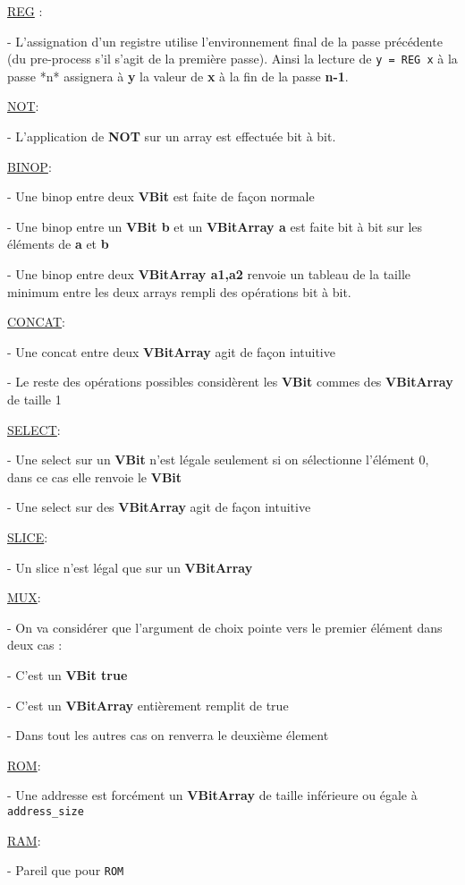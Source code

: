 \documentclass{article}
\begin{document}
\underline{REG} :

- L'assignation d'un registre utilise l'environnement final de la passe précédente (du pre-process s'il s'agit de la première passe). Ainsi la lecture de \verb|y = REG x| à la passe *n* assignera à \textbf{y} la valeur de \textbf{x} à la fin de la passe \textbf{n-1}. 

\underline{NOT}:

- L'application de \textbf{NOT} sur un array est effectuée bit à bit.

\underline{BINOP}:

- Une binop entre deux \textbf{VBit} est faite de façon normale

- Une binop entre un \textbf{VBit b} et un \textbf{VBitArray a}  est faite bit à bit sur les éléments de \textbf{a} et \textbf{b}

- Une binop entre deux \textbf{VBitArray a1,a2} renvoie un tableau de la taille minimum entre les deux arrays rempli des opérations bit à bit. 

\underline{CONCAT}:

- Une concat entre deux \textbf{VBitArray} agit de façon intuitive

- Le reste des opérations possibles considèrent les \textbf{VBit} commes des \textbf{VBitArray} de taille 1

\underline{SELECT}:

- Une select sur un \textbf{VBit} n'est légale seulement si on sélectionne l'élément 0, dans ce cas elle renvoie le \textbf{VBit}

- Une select sur des \textbf{VBitArray} agit de façon intuitive

\underline{SLICE}:

- Un slice n'est légal que sur un \textbf{VBitArray}

\underline{MUX}:

- On va considérer que l'argument de choix pointe vers le premier élément dans deux cas :

  - C'est un \textbf{VBit true}

  - C'est un \textbf{VBitArray} entièrement remplit de true

- Dans tout les autres cas on renverra le deuxième élement

\underline{ROM}:

- Une addresse est forcément un \textbf{VBitArray} de taille inférieure ou égale à \verb|address_size|

\underline{RAM}:

- Pareil que pour \verb|ROM|
\end{document}
